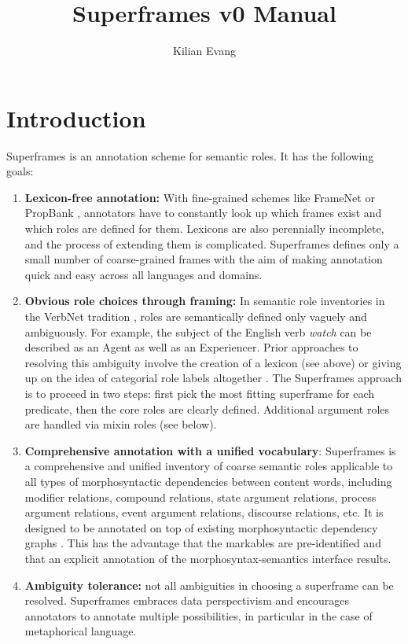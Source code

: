 \documentclass[a4paper]{article}
\title{Superframes v0 Manual}
\author{Kilian Evang}
\begin{document}
\maketitle

\tableofcontents

\clearpage
\section{Introduction}

Superframes is an annotation scheme for semantic roles. It has the following goals:

\begin{enumerate}
    \item \textbf{Lexicon-free annotation:} With fine-grained schemes like FrameNet \citep{baker-etal-1998-berkeley-framenet} or PropBank \citep{palmer-etal-2005-proposition}, annotators have to constantly look up which frames exist and which roles are defined for them. Lexicons are also perennially incomplete, and the process of extending them is complicated. Superframes defines only a small number of coarse-grained frames with the aim of making annotation quick and easy across all languages and domains.
    \item \textbf{Obvious role choices through framing:} In semantic role inventories in the VerbNet tradition \citep{kipper-schuler-2005-verbnet}, roles are semantically defined only vaguely and ambiguously. For example, the subject of the English verb \emph{watch} can be described as an Agent as well as an Experiencer. Prior approaches to resolving this ambiguity involve the creation of a lexicon (see above) or giving up on the idea of categorial role labels altogether \citep{white-etal-2016-universal}. The Superframes approach is to proceed in two steps: first pick the most fitting superframe for each predicate, then the core roles are clearly defined. Additional argument roles are handled via mixin roles (see below).
    \item \textbf{Comprehensive annotation with a unified vocabulary}: Superframes is a comprehensive and unified inventory of coarse semantic roles applicable to all types of morphosyntactic dependencies between content words, including modifier relations, compound relations, state argument relations, process argument relations, event argument relations, discourse relations, etc. It is designed to be annotated on top of existing morphosyntactic dependency graphs \citep[e.g., Universal Dependencies; ][]{de-marneffe-etal-2021-universal}. This has the advantage that the markables are pre-identified and that an explicit annotation of the morphosyntax-semantics interface results.
    \item \textbf{Ambiguity tolerance:} not all ambiguities in choosing a superframe can be resolved. Superframes embraces data perspectivism \citep{basile-2020-end} and encourages annotators to annotate multiple possibilities, in particular in the case of metaphorical language.
\end{enumerate}
\end{document}
